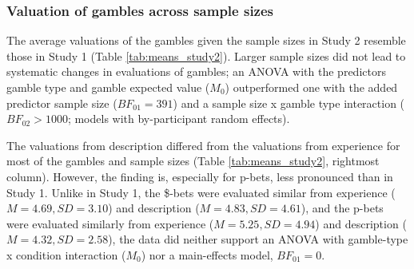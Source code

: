 \documentclass[
  a4paper, man, floatsintext]{apa6}
\author{Jana B. Jarecki}
\date{13 Mai, 2020}
\begin{document}
\subsubsection{Valuation of gambles across sample sizes}

The average valuations of the gambles given the sample sizes in Study 2
resemble those in Study 1 (Table \ref{tab:means_study2}). Larger sample
sizes did not lead to systematic changes in evaluations of gambles; an
ANOVA with the predictors gamble type and gamble expected value
(\(M_0\)) outperformed one with the added predictor sample size
(\(BF_{01} = 391\)) and a sample size x gamble type interaction
(\(BF_{02} > 1000\); models with by-participant random effects).

The valuations
from description differed from the valuations from experience for most
of the gambles and sample sizes (Table \ref{tab:means_study2}, rightmost
column). However, the finding is, especially for p-bets, less pronounced
than in Study 1. Unlike in Study 1, the \$-bets were evaluated similar
from experience (\(M=4.69, SD=3.10\)) and description
(\(M=4.83, SD=4.61\)), and the p-bets were evaluated similarly from
experience (\(M=5.25, SD=4.94\)) and description (\(M=4.32, SD=2.58\)),
the data did neither support an ANOVA with gamble-type x condition
interaction (\(M_0\)) nor a main-effects model, \(BF_{01} = 0\).
\end{document}
